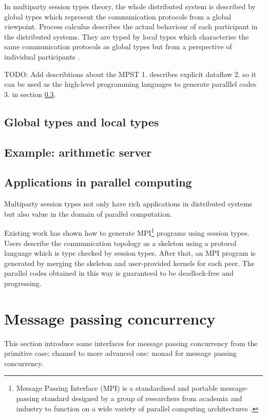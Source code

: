 In multiparty session types theory, the whole distributed system is described by global types which represent the communication protocols from a global viewpoint. Process calculus describes the actual behaviour of each participant in the distributed systems. They are typed by local types which characterise the same communication protocols as global types but from a perspective of individual participants \cite{coppoGentleIntroductionMultiparty2015}.

TODO: Add describtions about the MPST 1. describes explicit dataflow 2. so it can be used as the high-level programming languages to generate paralllel codes 3. in section \ref{b:mpst:app}.
\subsection{Global types and local types}
\subsection{Example: arithmetic server}
\subsection{Applications in parallel computing} \label{b:mpst:app}
Multiparty session types not only have rich applications in distributed systems but also value in the domain of parallel computation. 

Existing work\cite{ngSafeMPICode} has shown how to generate MPI\footnote{Message Passing Interface (MPI) is a standardised and portable message-passing standard designed by a group of researchers from academia and industry to function on a wide variety of parallel computing architectures \cite{MessagePassingInterface2018}.} programs using session types. Users describe the communication topology as a skeleton using a protocol language which is type checked by session types. After that, an MPI program is generated by merging the skeleton and user-provided kernels for each peer. The parallel codes obtained in this way is guaranteed to be deadlock-free and progressing. 

\section{Message passing concurrency}
This section introduce some interfaces for message passing concurrency from the primitive case: channel to more advanced one: monad for message passing concurrency.

